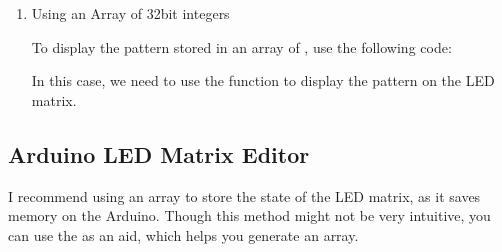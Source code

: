 \documentclass[a4paper,11pt,english]{sphinxmanual}
\begin{document}
\begin{enumerate}
\item {} 
\sphinxAtStartPar
Using an Array of 32\sphinxhyphen{}bit integers

\sphinxAtStartPar
To display the pattern stored in an array of , use the following code:

\begin{sphinxVerbatim}[commandchars=\\\{\}]



\PYG{p}{[}\PYG{p}{]}

\end{sphinxVerbatim}

\sphinxAtStartPar
In this case, we need to use the  function to display the pattern on the LED matrix.

\end{enumerate}


\subsection{Arduino LED Matrix Editor}
\label{\detokenize{Extension_Project/12x8_LED_Matrix:arduino-led-matrix-editor}}
\sphinxAtStartPar
I recommend using an  array to store the state of the LED matrix, as it saves memory on the Arduino. Though this method might not be very intuitive, you can use the  as an aid, which helps you generate an  array.
\end{document}
